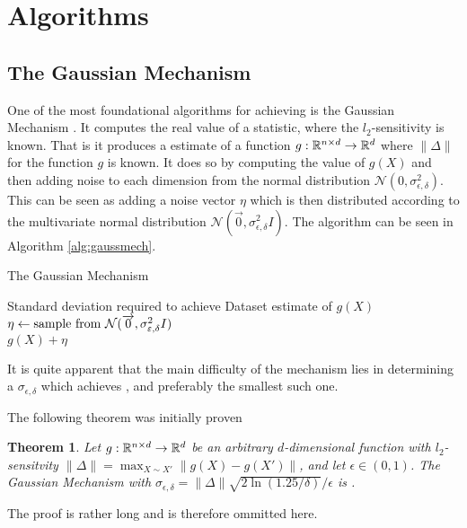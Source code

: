 \documentclass[a4paper,12pt]{article}
\newcommand{\Desc}[2]{\State \makebox[6em][l]{#1}#2}
\newtheorem{theorem}{Theorem}
\begin{document}
\section{Algorithms}
\subsection{The Gaussian Mechanism}
One of the most foundational algorithms for achieving 
\edp is the Gaussian Mechanism \cite{dpbasic}. It computes the real
value of a statistic, where the $l_2$-sensitivity is known.
That is it produces a \edp estimate of a function 
$g: \R^{n \times d} \rightarrow \R^{d}$ where $ \| \Delta \|$ 
for the function $g$ is known.
It does so by computing the value of $g(X)$ and then adding noise
to each dimension from the normal distribution 
$\mathcal{N}(0, \sigma_{\epsilon,\delta}^2)$.
This can be seen as adding a noise vector $\eta$ which 
is then distributed according to
the multivariate normal distribution 
$\mathcal{N}(\overrightarrow{0}, \sigma_{\epsilon,\delta}^2I)$. 
The algorithm can be seen in Algorithm \ref{alg:gaussmech}.

\begin{algorithm}
\caption{The Gaussian Mechanism}\label{alg:gaussmech}
\begin{algorithmic}
    \Input
    \Desc{$\sigma_{\epsilon,\delta}$}{Standard deviation required to achieve \edp}
    \Desc{$X \in \R^{n \times d}$}{Dataset}
    \EndInput
    \Output
    \State\edp estimate of $g(X)$
    \EndOutput
    \State$\eta \gets \textnormal{sample from } \mathcal{N}(\overrightarrow{0}, \sigma_{\epsilon,\delta}^2I)$ \\
    \Return$g(X) + \eta$
\end{algorithmic}
\end{algorithm}
It is quite apparent that the main difficulty of the mechanism 
lies in determining a $\sigma_{\epsilon, \delta}$ which achieves
\edp, and preferably the smallest such one.

The following theorem was initially proven
\begin{theorem}\textnormal{\cite{dpbasic}}
\label{theo:gaussMech}
Let $g: \R^{n \times d} \rightarrow \R^{d}$ be an arbitrary 
$d$-dimensional function with $l_2$-sensitvity 
$\| \Delta \| = \max_{X \sim X'} \| g(X) - g(X') \|$, 
and let $\epsilon \in (0,1)$.
The Gaussian Mechanism with
$\sigma_{\epsilon, \delta} = \| \Delta \| \sqrt{2\ln(1.25/\delta)}/\epsilon$ 
is \edp.
\end{theorem}
The proof is rather long and is therefore ommitted here.
\end{document}
